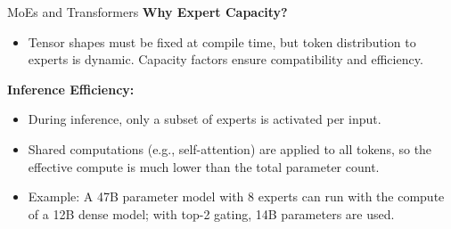 \begin{frame}[allowframebreaks]{MoEs and Transformers}
    \textbf{Why Expert Capacity?}
    \begin{itemize}
        \item Tensor shapes must be fixed at compile time, but token distribution to experts is dynamic. Capacity factors ensure compatibility and efficiency.
    \end{itemize}

\framebreak

    \textbf{Inference Efficiency:}
    \begin{itemize}
        \item During inference, only a subset of experts is activated per input.
        \item Shared computations (e.g., self-attention) are applied to all tokens, so the effective compute is much lower than the total parameter count.
        \item Example: A 47B parameter model with 8 experts can run with the compute of a 12B dense model; with top-2 gating, 14B parameters are used.
    \end{itemize}
\end{frame}

